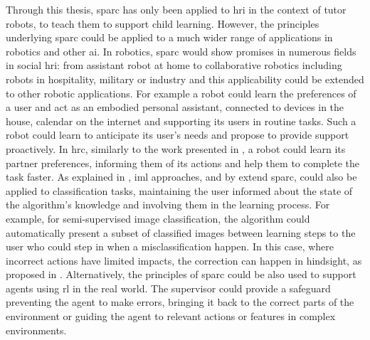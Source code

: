 Through this thesis, \gls{sparc} has only been applied to \gls{hri} in the context of tutor robots, to teach them to support child learning. However, the principles underlying \gls{sparc} could be applied to a much wider range of applications in robotics and other \gls{ai}. In robotics, \gls{sparc} would show promises in numerous fields in social \gls{hri}: from assistant robot at home to collaborative robotics including robots in hospitality, military or industry and this applicability could be extended to other robotic applications. For example a robot could learn the preferences of a user and act as an embodied personal assistant, connected to devices in the house, calendar on the internet and supporting its users in routine tasks. Such a robot could learn to anticipate its user's needs and propose to provide support proactively. In \gls{hrc}, similarly to the work presented in \cite{munzer2017efficient}, a robot could learn its partner preferences, informing them of its actions and help them to complete the task faster. As explained in \cite{feil2005defining}, \gls{iml} approaches, and by extend \gls{sparc}, could also be applied to classification tasks, maintaining the user informed about the state of the algorithm's knowledge and involving them in the learning process. For example, for semi-supervised image classification, the algorithm could automatically present a subset of classified images between learning steps to the user who could step in when a misclassification happen. In this case, where incorrect actions have limited impacts, the correction can happen in hindsight, as proposed in \cite{chernova2009interactive}. Alternatively, the principles of \gls{sparc} could be also used to support agents using \gls{rl} in the real world. The supervisor could provide a safeguard preventing the agent to make errors, bringing it back to the correct parts of the environment or guiding the agent to relevant actions or features in complex environments.


